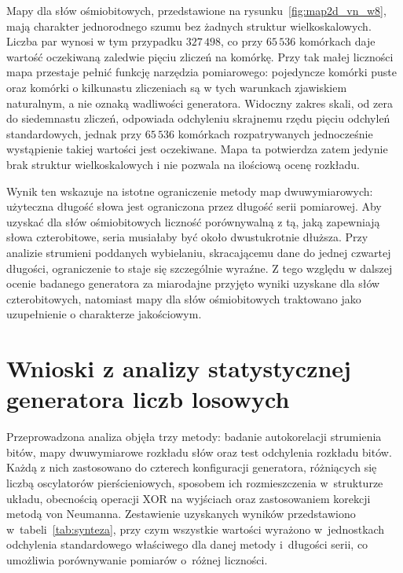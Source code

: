 Mapy dla słów ośmiobitowych, przedstawione na rysunku~\ref{fig:map2d_vn_w8}, mają
charakter jednorodnego szumu bez żadnych struktur wielkoskalowych. Liczba par wynosi
w tym przypadku $327\,498$, co przy $65\,536$ komórkach daje wartość oczekiwaną zaledwie
pięciu zliczeń na komórkę. Przy tak małej liczności mapa przestaje pełnić funkcję
narzędzia pomiarowego: pojedyncze komórki puste oraz komórki o kilkunastu zliczeniach są
w tych warunkach zjawiskiem naturalnym, a nie oznaką wadliwości generatora. Widoczny
zakres skali, od zera do siedemnastu zliczeń, odpowiada odchyleniu skrajnemu rzędu pięciu
odchyleń standardowych, jednak przy $65\,536$ komórkach rozpatrywanych jednocześnie
wystąpienie takiej wartości jest oczekiwane. Mapa ta potwierdza zatem jedynie brak
struktur wielkoskalowych i nie pozwala na ilościową ocenę rozkładu.

Wynik ten wskazuje na istotne ograniczenie metody map dwuwymiarowych: użyteczna długość
słowa jest ograniczona przez długość serii pomiarowej. Aby uzyskać dla słów
ośmiobitowych liczność porównywalną z tą, jaką zapewniają słowa czterobitowe, seria
musiałaby być około dwustukrotnie dłuższa. Przy analizie strumieni poddanych wybielaniu,
skracającemu dane do jednej czwartej długości, ograniczenie to staje się szczególnie
wyraźne. Z tego względu w dalszej ocenie badanego generatora za miarodajne przyjęto
wyniki uzyskane dla słów czterobitowych, natomiast mapy dla słów ośmiobitowych
traktowano jako uzupełnienie o charakterze jakościowym.

\FloatBarrier

\section{Wnioski z analizy statystycznej generatora liczb losowych}

Przeprowadzona analiza objęła trzy metody: badanie autokorelacji strumienia bitów, mapy
dwuwymiarowe rozkładu słów oraz test odchylenia rozkładu bitów. Każdą z nich zastosowano
do czterech konfiguracji generatora, różniących się liczbą oscylatorów pierścieniowych,
sposobem ich rozmieszczenia w~strukturze układu, obecnością operacji XOR na wyjściach oraz
zastosowaniem korekcji metodą von Neumanna. Zestawienie uzyskanych wyników przedstawiono
w~tabeli~\ref{tab:synteza}, przy czym wszystkie wartości wyrażono w~jednostkach odchylenia
standardowego właściwego dla danej metody i~długości serii, co umożliwia porównywanie
pomiarów o~różnej liczności.

